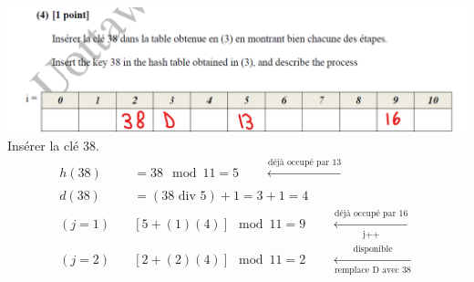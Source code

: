 \documentclass[12pt]{book}
\begin{document}
\begin{enumerate}
    \includegraphics[scale=0.60]{d7q3a4.png}\\
    Insérer la clé 38.
    \begin{align*}
        h(38) &= 38\mod 11 = 5 \qquad \xleftarrow[]{\text{déjà occupé par 13}}\\
        d(38) &= (38 \text{ div } 5) + 1 = 3 + 1 = 4\\
        (j = 1) \quad &[5 + (1)(4)]\mod 11 = 9 \qquad \xleftarrow[\text{j++}]{\text{déjà occupé par 16}}\\
        (j = 2) \quad &[2 + (2)(4)]\mod 11 = 2 \qquad \xleftarrow[\text{remplace D avec 38}]{\text{disponible}}
    \end{align*}
    
    
    
    
\end{enumerate}
\end{document}
